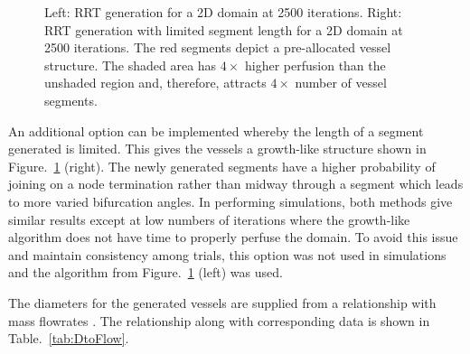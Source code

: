 \documentclass[11pt,english,a4paper,twoside,openright]{report}
\begin{document}
{{{{{{{{\begin{figure}[h]
	\centering
	\caption[Comparison of two methods of RRT generation with variable regions of perfusion]{Left: RRT generation for a 2D domain at 2500 iterations. Right: RRT generation with limited segment length for a 2D domain at 2500 iterations. The red segments depict a pre-allocated vessel structure. The shaded area has $4\times$ higher perfusion than the unshaded region and, therefore, attracts $4\times$ number of vessel segments.}
	\label{fig:RRTComparison}
\end{figure}

An additional option can be implemented whereby the length of a segment generated is limited. This gives the vessels a growth-like structure shown in Figure.~\ref{fig:RRTComparison} (right). The newly generated segments have a higher probability of joining on a node termination rather than midway through a segment which leads to more varied bifurcation angles. In performing simulations, both methods give similar results except at low numbers of iterations where the growth-like algorithm does not have time to properly perfuse the domain. To avoid this issue and maintain consistency among trials, this option was not used in simulations and the algorithm from Figure.~\ref{fig:RRTComparison} (left) was used.

The diameters for the generated vessels are supplied from a relationship with mass flowrates \cite{kolios1995large}. The relationship along with corresponding data is shown in Table.~\ref{tab:DtoFlow}.

}}}}}}}}
\end{document}

